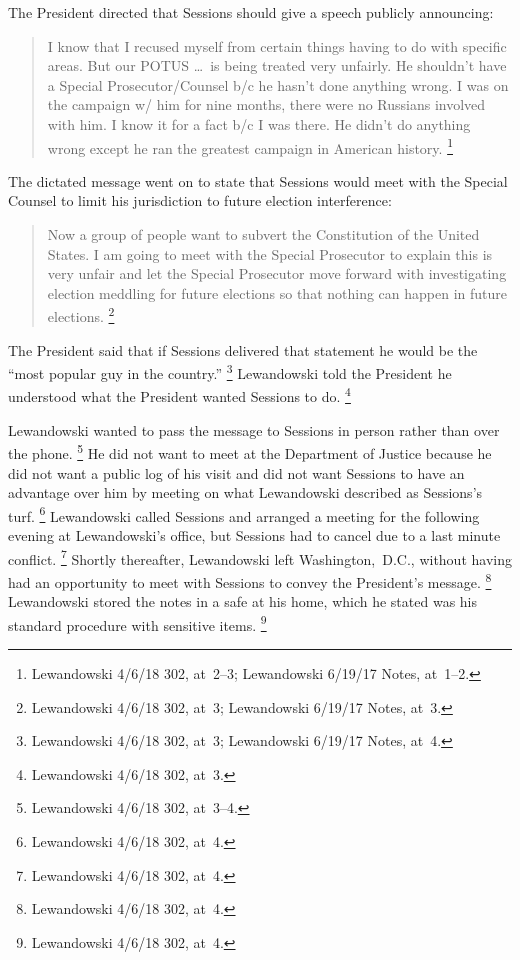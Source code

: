 The President directed that Sessions should give a speech publicly announcing:

\begin{quote}
I know that I recused myself from certain things having to do with specific areas.
But our POTUS \dots\ is being treated very unfairly.
He shouldn't have a Special Prosecutor/Counsel b/c he hasn't done anything wrong.
I was on the campaign w/ him for nine months, there were no Russians involved with him.
I know it for a fact b/c I was there.
He didn't do anything wrong except he ran the greatest campaign in American history.%
\footnote{Lewandowski 4/6/18 302, at~2--3;
Lewandowski 6/19/17 Notes, at~1--2.}
\end{quote}

The dictated message went on to state that Sessions would meet with the Special Counsel to limit his jurisdiction to future election interference:

\begin{quote}
Now a group of people want to subvert the Constitution of the United States.
I am going to meet with the Special Prosecutor to explain this is very unfair and let the Special Prosecutor move forward with investigating election meddling for future elections so that nothing can happen in future elections.%
\footnote{Lewandowski 4/6/18 302, at~3;
Lewandowski 6/19/17 Notes, at~3.}
\end{quote}

The President said that if Sessions delivered that statement he would be the ``most popular guy in the country.''%
\footnote{Lewandowski 4/6/18 302, at~3;
Lewandowski 6/19/17 Notes, at~4.}
Lewandowski told the President he understood what the President wanted Sessions to do.%
\footnote{Lewandowski 4/6/18 302, at~3.}

Lewandowski wanted to pass the message to Sessions in person rather than over the phone.%
\footnote{Lewandowski 4/6/18 302, at~3--4.}
He did not want to meet at the Department of Justice because he did not want a public log of his visit and did not want Sessions to have an advantage over him by meeting on what Lewandowski described as Sessions's turf.%
\footnote{Lewandowski 4/6/18 302, at~4.}
Lewandowski called Sessions and arranged a meeting for the following evening at Lewandowski's office, but Sessions had to cancel due to a last minute conflict.%
\footnote{Lewandowski 4/6/18 302, at~4.}
Shortly thereafter, Lewandowski left Washington,~D.C., without having had an opportunity to meet with Sessions to convey the President's message.%
\footnote{Lewandowski 4/6/18 302, at~4.}
Lewandowski stored the notes in a safe at his home, which he stated was his standard procedure with sensitive items.%
\footnote{Lewandowski 4/6/18 302, at~4.}

